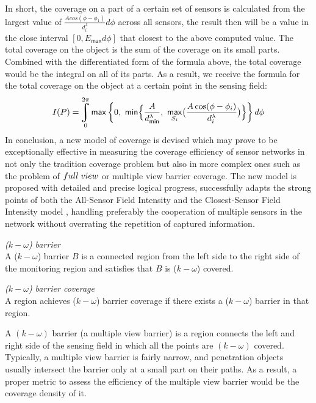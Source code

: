 In short, the coverage on a part of a certain set of sensors is calculated from the largest value of $\displaystyle\frac{Acos(\phi - \phi_1)}{d_i^\lambda}d\phi$ across all sensors, the result then will be a value in the close interval $[0, E_{\mathsf{max}}d\phi]$ that closest to the above computed value. The total coverage on the object is the sum of the coverage on its small parts. Combined with the differentiated form of the formula above, the total coverage would be the integral on all of its parts. As a result, we receive the formula for the total coverage on the object at a certain point in the sensing field:
\begin{equation}
I(P) = \uint\limits_0^{2\pi}{\mathsf{max}\left\{0,\ \mathsf{min}\Big\{\frac{A}{d_{\mathsf{min}}^\lambda}, \ \underset{S_i}{\mathsf{max}}\big(\frac{A\cos(\phi - \phi_i)}{d_i^\lambda}\big)\Big\}\right\}d\phi}
\end{equation}
In conclusion, a new model of coverage is devised which may prove to be exceptionally effective in measuring the coverage efficiency of sensor networks in not only the tradition coverage problem but also in more complex ones such as the problem of $full\hspace{1mm}view$ or multiple view barrier coverage. The new model is proposed with detailed and precise logical progress, successfully adapts the strong points of both the All-Sensor Field Intensity and the Closest-Sensor Field Intensity model \cite{megerian2002exposure}, handling preferably the cooperation of multiple sensors in the network without overrating the repetition of captured information.

\begin{df}{\itshape($k-\omega$) barrier}\\
	A ($k-\omega$) barrier $B$ is a connected region from the left side to the right side of the monitoring region and satisfies that $B$ is ($k-\omega$) covered.
\end{df}
\begin{df}{\itshape($k-\omega$) barrier coverage}\\
	A region achieves ($k-\omega$) barrier coverage if there exists a ($k-\omega$) barrier in that region.\par
\end{df}

A $(k-\omega)$ barrier (a multiple view barrier) is a region connects the left and right side of the sensing field in which all the points are $(k-\omega)$ covered. Typically, a multiple view barrier is fairly narrow, and penetration objects usually intersect the barrier only at a small part on their paths. As a result, a proper metric to assess the efficiency of the multiple view barrier would be the coverage density of it.

